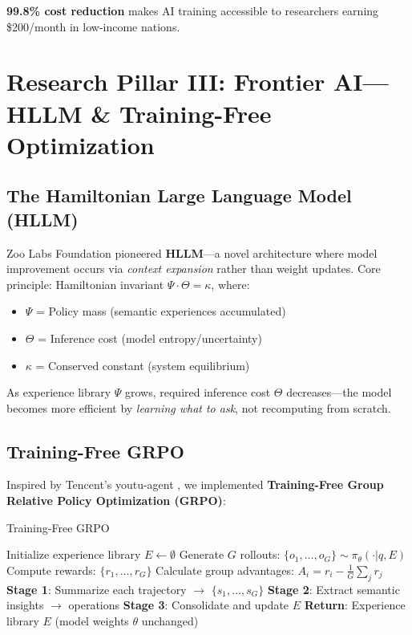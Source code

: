 \documentclass[twocolumn,11pt]{article}
\begin{document}
\textbf{99.8\% cost reduction} makes AI training accessible to researchers earning \$200/month in low-income nations.

\section{Research Pillar III: Frontier AI—HLLM \& Training-Free Optimization}

\subsection{The Hamiltonian Large Language Model (HLLM)}

Zoo Labs Foundation pioneered \textbf{HLLM}—a novel architecture where model improvement occurs via \textit{context expansion} rather than weight updates. Core principle: Hamiltonian invariant $\Psi \cdot \Theta = \kappa$, where:

\begin{itemize}
    \item $\Psi$ = Policy mass (semantic experiences accumulated)
    \item $\Theta$ = Inference cost (model entropy/uncertainty)
    \item $\kappa$ = Conserved constant (system equilibrium)
\end{itemize}

As experience library $\Psi$ grows, required inference cost $\Theta$ decreases—the model becomes more efficient by \textit{learning what to ask}, not recomputing from scratch.

\subsection{Training-Free GRPO}

Inspired by Tencent's youtu-agent \citep{youtu2024trainingfree}, we implemented \textbf{Training-Free Group Relative Policy Optimization (GRPO)}:

\begin{algorithm}[h]
\caption{Training-Free GRPO}
\begin{algorithmic}
\STATE Initialize experience library $E \leftarrow \emptyset$
        \STATE Generate $G$ rollouts: $\{o_1, \ldots, o_G\} \sim \pi_\theta(\cdot|q, E)$
        \STATE Compute rewards: $\{r_1, \ldots, r_G\}$
        \STATE Calculate group advantages: $A_i = r_i - \frac{1}{G}\sum_j r_j$
            \STATE \textbf{Stage 1}: Summarize each trajectory $\rightarrow$ $\{s_1, \ldots, s_G\}$
            \STATE \textbf{Stage 2}: Extract semantic insights $\rightarrow$ operations
            \STATE \textbf{Stage 3}: Consolidate and update $E$
        \ENDIF
    \ENDFOR
\ENDFOR
\STATE \textbf{Return}: Experience library $E$ (model weights $\theta$ unchanged)
\end{algorithmic}
\end{algorithm}
\end{document}
